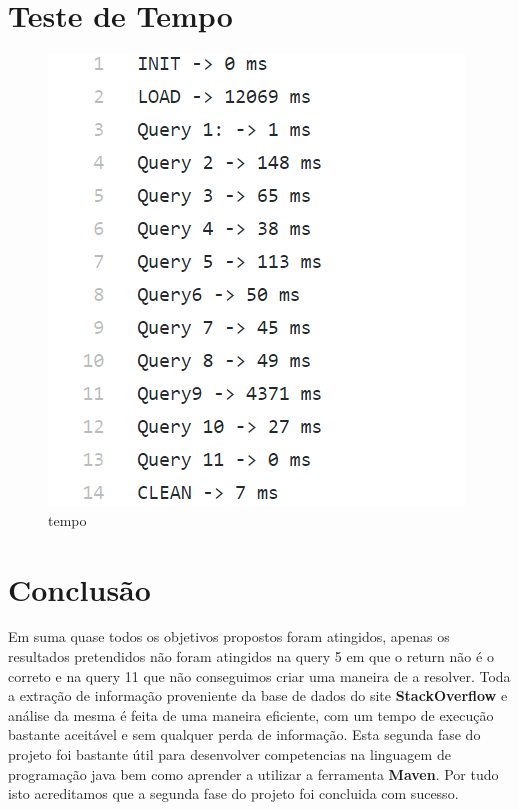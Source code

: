 \documentclass[a4paper]{article}
\begin{document}
\section {Teste de Tempo}

\begin{figure}[H]
	\centering
	\includegraphics[scale =0.20]{tempo.png}
	\caption{tempo}
	\label{img:tempo}
	\end{figure}


\section{Conclusão}

Em suma quase todos os objetivos propostos foram atingidos, apenas os resultados pretendidos não foram atingidos na query 5 em que o return não é o correto e na query 11 que não conseguimos criar uma maneira de a resolver. Toda a extração de informação proveniente da base de dados do site \textbf{StackOverflow} e análise da mesma é feita de uma maneira eficiente, com um tempo de execução bastante aceitável e sem qualquer perda de informação. Esta segunda fase do projeto foi bastante útil para desenvolver competencias na linguagem de programação java bem como aprender a utilizar a ferramenta \textbf{Maven}. 
Por tudo isto acreditamos que a segunda fase do projeto foi concluida com sucesso.
\end{document}
